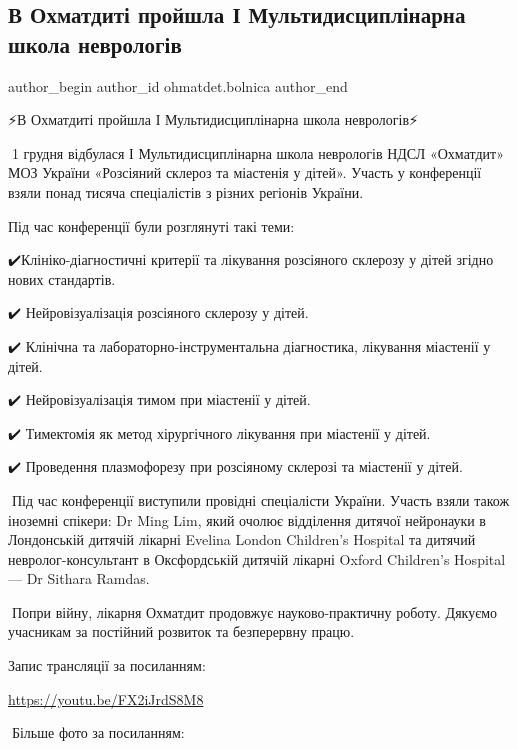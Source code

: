  
 
 
 
 
 
\subsection{В Охматдиті пройшла І Мультидисциплінарна школа неврологів}
\label{sec:05_12_2022.fb.ohmatdet.bolnica.1.shkola_nevrologia}
 
\ifcmt
 author_begin
   author_id ohmatdet.bolnica
 author_end
\fi

⚡️В Охматдиті пройшла І Мультидисциплінарна школа неврологів⚡️

🔻1 грудня відбулася І Мультидисциплінарна школа неврологів НДСЛ «Охматдит» МОЗ
України «Розсіяний склероз та міастенія у дітей». Участь у конференції взяли
понад тисяча спеціалістів з різних регіонів України. 

Під час конференції були розглянуті такі теми: 

✔️Клініко-діагностичні критерії та лікування розсіяного склерозу у дітей згідно нових стандартів.\par
✔️ Нейровізуалізація розсіяного склерозу у дітей.\par
✔️ Клінічна та лабораторно-інструментальна діагностика, лікування міастенії у дітей.\par
✔️ Нейровізуалізація тимом при міастенії у дітей.\par
✔️ Тимектомія як метод хірургічного лікування при міастенії у дітей.\par
✔️ Проведення плазмофорезу при розсіяному склерозі та міастенії у дітей.\par

🔻Під час конференції виступили провідні спеціалісти України. Участь взяли
також іноземні спікери: Dr Ming Lim, який очолює відділення дитячої нейронауки
в Лондонській дитячій лікарні Evelina London Children’s Hospital та дитячий
невролог-консультант в Оксфордській дитячій лікарні Oxford Children’s Hospital
— Dr Sithara Ramdas.

🔻Попри війну, лікарня Охматдит продовжує науково-практичну роботу. Дякуємо
учасникам за постійний розвиток та безперервну працю. 

Запис трансляції за посиланням:

\url{https://youtu.be/FX2iJrdS8M8}

📸Більше фото за посиланням:

